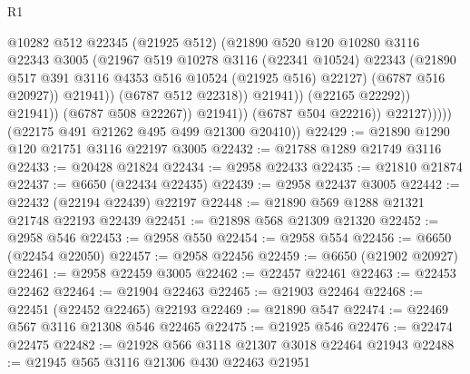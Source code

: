 \begin{lexlean}{R1}
\begin{coremodule}
                                      @10282
                                      @512
                                      @22345
                                      (@21925 @512)
                                      (@21890
                                        @520
                                        @120
                                        @10280
                                        @3116
                                        @22343
                                        @3005
                                        (@21967
                                          @519
                                          @10278
                                          @3116
                                          (@22341 @10524)
                                          @22343
                                          (@21890
                                            @517
                                            @391
                                            @3116
                                            @4353
                                            @516
                                            @10524
                                            (@21925 @516)
                                            @22127)
                                          (@6787 @516 @20927))
                                        @21941))
                                    (@6787 @512 @22318))
                                  @21941))
                              (@22165 @22292))
                            @21941))
                        (@6787 @508 @22267))
                      @21941))
                  (@6787 @504 @22216))
                @22127)))))
      (@22175 @491 @21262 @495 @499 @21300 @20410))
@22429 := @21890 @1290 @120 @21751 @3116 @22197 @3005
@22432 := @21788 @1289 @21749 @3116
@22433 := @20428 @21824
@22434 := @2958 @22433
@22435 := @21810 @21874
@22437 := @6650 (@22434 @22435)
@22439 := @2958 @22437 @3005
@22442 := @22432 (@22194 @22439) @22197
@22448 := @21890 @569 @1288 @21321 @21748 @22193 @22439
@22451 := @21898 @568 @21309 @21320
@22452 := @2958 @546
@22453 := @2958 @550
@22454 := @2958 @554
@22456 := @6650 (@22454 @22050)
@22457 := @2958 @22456
@22459 := @6650 (@21902 @20927)
@22461 := @2958 @22459 @3005
@22462 := @22457 @22461
@22463 := @22453 @22462
@22464 := @21904 @22463
@22465 := @21903 @22464
@22468 := @22451 (@22452 @22465) @22193
@22469 := @21890 @547
@22474 := @22469 @567 @3116 @21308 @546 @22465
@22475 := @21925 @546
@22476 := @22474 @22475
@22482 := @21928 @566 @3118 @21307 @3018 @22464 @21943
@22488 := @21945 @565 @3116 @21306 @430 @22463 @21951

\end{coremodule}
\end{lexlean}
